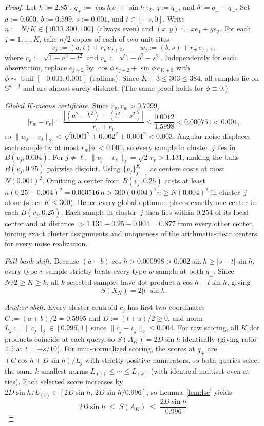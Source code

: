 \documentclass[11pt]{article}
\theoremstyle{plain}
\theoremstyle{definition}
\theoremstyle{remark}
\DeclareMathOperator{\Unif}{Unif}
\begin{document}
\begin{proof}
Let $h := 2.85^\circ$, $q_\pm := \cos h\, e_1 \pm \sin h\, e_2$, $q := q_-$, and $\delta := q_+ - q_-$. Set $a := 0.600$, $b := 0.599$, $s := 0.001$, and $t \in [-s, 0]$. Write $n := N / K \in \{1000, 300, 100\}$ (always even) and $(x, y) := x e_1 + y e_2$. For each $j = 1, \dots, K$, take $n/2$ copies of each of two unit sites
\[
v_j := (a, t) + r_v\, e_{j+2}, \qquad w_j := (b, s) + r_w\, e_{j+2},
\]
where $r_v := \sqrt{1 - a^2 - t^2}$ and $r_w := \sqrt{1 - b^2 - s^2}$. Independently for each observation, replace $e_{j+2}$ by $\cos\phi\, e_{j+2} + \sin\phi\, e_{K+3}$ with $\phi \sim \Unif[-0.001, 0.001]$ (radians). Since $K + 3 \le 303 \le 384$, all samples lie on $\mathbb{S}^{d-1}$ and are almost surely distinct. (The same proof holds for $\phi \equiv 0$.)

\emph{Global $K$-means certificate.} Since $r_v, r_w > 0.7999$,
\[
|r_w - r_v| = \frac{|(a^2 - b^2) + (t^2 - s^2)|}{r_w + r_v} \le \frac{0.0012}{1.5998} < 0.000751 < 0.001,
\]
so $\|w_j - v_j\|_2 < \sqrt{0.001^2 + 0.002^2 + 0.001^2} < 0.003$. Angular noise displaces each sample by at most $r_w |\phi| < 0.001$, so every sample in cluster~$j$ lies in $B(v_j, 0.004)$. For $j \neq \ell$, $\|v_j - v_\ell\|_2 = \sqrt{2}\,r_v > 1.131$, making the balls $B(v_j, 0.25)$ pairwise disjoint. Using $\{v_j\}_{j=1}^K$ as centers costs at most $N(0.004)^2$. Omitting a center from $B(v_j, 0.25)$ costs at least $n(0.25 - 0.004)^2 = 0.060516\,n > 300(0.004)^2 n \ge N(0.004)^2$ in cluster~$j$ alone (since $K \le 300$). Hence every global optimum places exactly one center in each $B(v_j, 0.25)$. Each sample in cluster~$j$ then lies within $0.254$ of its local center and at distance $> 1.131 - 0.25 - 0.004 = 0.877$ from every other center, forcing exact cluster assignments and uniqueness of the arithmetic-mean centers for every noise realization.

\emph{Full-bank shift.} Because $(a - b)\cos h > 0.000998 > 0.002\sin h \ge |s - t|\sin h$, every type-$v$ sample strictly beats every type-$w$ sample at both $q_\pm$. Since $N/2 \ge K \ge k$, all $k$ selected samples have dot product $a\cos h \pm t\sin h$, giving
\[
S(X_N) = 2|t|\sin h.
\]

\emph{Anchor shift.} Every cluster centroid $c_j$ has first two coordinates $C := (a + b)/2 = 0.5995$ and $D := (t + s)/2 \ge 0$, and norm $L_j := \|c_j\|_2 \in [0.996, 1]$ since $\|c_j - v_j\|_2 \le 0.004$. For raw scoring, all $K$ dot products coincide at each query, so $S(A_K) = 2D\sin h$ identically (giving ratio $4.5$ at $t = -s/10$). For unit-normalized scoring, the scores at $q_\pm$ are $(C\cos h \pm D\sin h)/L_j$ with strictly positive numerators, so both queries select the same $k$ smallest norms $L_{(1)} \le \cdots \le L_{(k)}$ (with identical multiset even at ties). Each selected score increases by $2D\sin h / L_{(i)} \in [2D\sin h,\, 2D\sin h / 0.996]$, so Lemma~\ref{lem:lse} yields
\begin{equation}\label{eq:unit-bracket}
2D\sin h \;\le\; S(A_K) \;\le\; \frac{2D\sin h}{0.996}.
\end{equation}


\end{proof}
\end{document}
